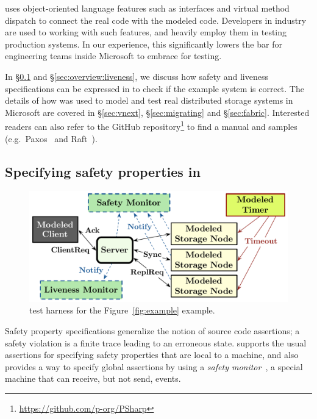 \psharp uses object-oriented language features such as interfaces and virtual method dispatch to connect the real code with the modeled code. Developers in industry are used to working with such features, and heavily employ them in testing production systems. In our experience, this significantly lowers the bar for engineering teams inside Microsoft to embrace \psharp for testing.

In \S\ref{sec:overview:safety} and \S\ref{sec:overview:liveness}, we discuss how safety and liveness specifications can be expressed in \psharp to check if the example system is correct. The details of how \psharp was used to model and test real distributed storage systems in Microsoft are covered in \S\ref{sec:vnext}, \S\ref{sec:migrating} and \S\ref{sec:fabric}. Interested readers can also refer to the \psharp GitHub repository\footnote{\url{https://github.com/p-org/PSharp}} to find a manual and samples (e.g.\ Paxos~\cite{lamport1998part} and Raft~\cite{ongaro2014raft}).

\vspace{-1mm}
\subsection{Specifying safety properties in \psharp}
\label{sec:overview:safety}

\begin{figure}[t]
\centering
\includegraphics[width=\linewidth]{img/example}
\vspace{-5mm}
\caption{\psharp test harness for the Figure~\ref{fig:example} example.}
\label{fig:example:model}
\vspace{-2mm}
\end{figure}

Safety property specifications generalize the notion of source code assertions; a safety violation is a finite trace leading to an erroneous state. \psharp supports the usual assertions for specifying safety properties that are local to a \psharp machine, and also provides a way to specify global assertions by using a \emph{safety monitor}~\cite{desai2015building}, a special \psharp machine that can receive, but not send, events.

